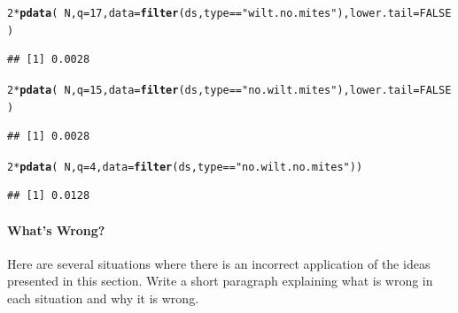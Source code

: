 \documentclass[10pt]{article}\usepackage[]{graphicx}\usepackage[]{color}
\makeatletter
\newcommand{\hlnum}[1]{\textcolor[rgb]{0.686,0.059,0.569}{#1}}%
\newcommand{\hlstr}[1]{\textcolor[rgb]{0.192,0.494,0.8}{#1}}%
\newcommand{\hlopt}[1]{\textcolor[rgb]{0,0,0}{#1}}%
\newcommand{\hlstd}[1]{\textcolor[rgb]{0.345,0.345,0.345}{#1}}%
\newcommand{\hlkwc}[1]{\textcolor[rgb]{0.333,0.667,0.333}{#1}}%
\newcommand{\hlkwd}[1]{\textcolor[rgb]{0.737,0.353,0.396}{\textbf{#1}}}%
\newenvironment{kframe}{%
 \def\at@end@of@kframe{}%
 \ifinner\ifhmode%
  \def\at@end@of@kframe{\end{minipage}}%
  \begin{minipage}{\columnwidth}%
 \fi\fi%
 \def\FrameCommand##1{\hskip\@totalleftmargin \hskip-\fboxsep
 \colorbox{shadecolor}{##1}\hskip-\fboxsep
     \hskip-\linewidth \hskip-\@totalleftmargin \hskip\columnwidth}%
 \MakeFramed {\advance\hsize-\width
   \@totalleftmargin\z@ \linewidth\hsize
   \@setminipage}}%
 {\par\unskip\endMakeFramed%
 \at@end@of@kframe}
\newenvironment{knitrout}{}{} %
\makeatother
\begin{document}
\begin{knitrout}
\begin{kframe}
\begin{alltt}
\hlnum{2} \hlopt{*} \hlkwd{pdata}\hlstd{(}\hlopt{~}\hlstd{N,} \hlkwc{q} \hlstd{=} \hlnum{17}\hlstd{,} \hlkwc{data} \hlstd{=} \hlkwd{filter}\hlstd{(ds, type} \hlopt{==} \hlstr{"wilt.no.mites"}\hlstd{),} \hlkwc{lower.tail} \hlstd{=} \hlnum{FALSE}\hlstd{)}
\end{alltt}
\begin{verbatim}
## [1] 0.0028
\end{verbatim}
\begin{alltt}
\hlnum{2} \hlopt{*} \hlkwd{pdata}\hlstd{(}\hlopt{~}\hlstd{N,} \hlkwc{q} \hlstd{=} \hlnum{15}\hlstd{,} \hlkwc{data} \hlstd{=} \hlkwd{filter}\hlstd{(ds, type} \hlopt{==} \hlstr{"no.wilt.mites"}\hlstd{),} \hlkwc{lower.tail} \hlstd{=} \hlnum{FALSE}\hlstd{)}
\end{alltt}
\begin{verbatim}
## [1] 0.0028
\end{verbatim}
\begin{alltt}
\hlnum{2} \hlopt{*} \hlkwd{pdata}\hlstd{(}\hlopt{~}\hlstd{N,} \hlkwc{q} \hlstd{=} \hlnum{4}\hlstd{,} \hlkwc{data} \hlstd{=} \hlkwd{filter}\hlstd{(ds, type} \hlopt{==} \hlstr{"no.wilt.no.mites"}\hlstd{))}
\end{alltt}
\begin{verbatim}
## [1] 0.0128
\end{verbatim}
\end{kframe}
\end{knitrout}


\paragraph{What's Wrong?}

Here are several situations where there is an incorrect application of the ideas presented in this section. Write a short paragraph explaining what is wrong in each situation and why it is wrong. 
\end{document}
